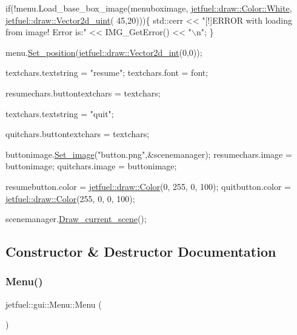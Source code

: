 \begin{DoxyCode}
\textcolor{keywordflow}{if}(!menu.Load\_base\_box\_image(menuboximage,
                             \hyperlink{classjetfuel_1_1draw_1_1Color_ab75797c1cb6e4dd952037916db39b5e8}{jetfuel::draw::Color::White},
                             \hyperlink{classjetfuel_1_1draw_1_1Vector2d}{jetfuel::draw::Vector2d\_uint}(
                                                    45,20)))\{
    std::cerr << \textcolor{stringliteral}{"[!]ERROR with loading from image! Error is:"} <<
    IMG\_GetError() << \textcolor{stringliteral}{"\(\backslash\)n"};
\}

menu.\hyperlink{classjetfuel_1_1gui_1_1Menu_ab575d5e4ad9d86d6781012e7d1bebc9a}{Set\_position}(\hyperlink{classjetfuel_1_1draw_1_1Vector2d}{jetfuel::draw::Vector2d\_int}(0,0));

textchars.textstring = \textcolor{stringliteral}{"resume"};
textchars.font = font;

resumechars.buttontextchars = textchars;

textchars.textstring = \textcolor{stringliteral}{"quit"};

quitchars.buttontextchars = textchars;

buttonimage.\hyperlink{classjetfuel_1_1draw_1_1Image_a2259992a6ae87fdebfe088f07a7bcc4e}{Set\_image}(\textcolor{stringliteral}{"button.png"},&scenemanager);
resumechars.image = buttonimage;
quitchars.image = buttonimage;

resumebutton.color = \hyperlink{classjetfuel_1_1draw_1_1Color}{jetfuel::draw::Color}(0, 255, 0, 100);
quitbutton.color = \hyperlink{classjetfuel_1_1draw_1_1Color}{jetfuel::draw::Color}(255, 0, 0, 100);

scenemanager.\hyperlink{classjetfuel_1_1draw_1_1Scene__manager_a8af9a3abfd5121b1b8556342de435773}{Draw\_current\_scene}();
\end{DoxyCode}
 

\subsection{Constructor \& Destructor Documentation}
\mbox{\label{classjetfuel_1_1gui_1_1Menu_a8cdd5967a5c57fd28924ac5f9c979398}} 
\subsubsection{\texorpdfstring{Menu()}{Menu()}\hspace{0.1cm}{\footnotesize\ttfamily [1/2]}}
{\footnotesize\ttfamily jetfuel\+::gui\+::\+Menu\+::\+Menu (\begin{DoxyParamCaption}{ }\end{DoxyParamCaption})\hspace{0.3cm}{\ttfamily [inline]}}




